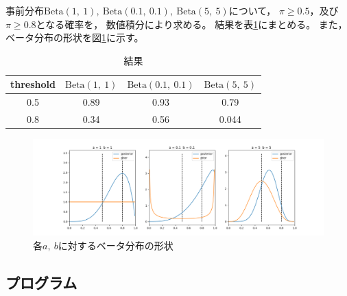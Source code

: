 \documentclass[dvipdfmx, fleqn]{jsarticle}
\begin{document}
事前分布\(\mathrm{Beta}(1,\ 1),\ \mathrm{Beta}(0.1,\ 0.1),\ \mathrm{Beta}(5,\ 5)\)について，
\(\pi \ge 0.5\)，及び\(\pi \ge 0.8\)となる確率を，
数値積分により求める。
結果を表\ref{tab:result}にまとめる。
また，ベータ分布の形状を図\ref{fig:beta_dists}に示す。


\begin{table}
    \centering
    \caption{結果}
    \begin{tabular}{cccc}
        threshold & \(\mathrm{Beta}(1,\ 1)\) & \(\mathrm{Beta}(0.1,\ 0.1)\) & \(\mathrm{Beta}(5,\ 5)\) \\ \hline
        0.5 & 0.89 & 0.93 & 0.79 \\
        0.8 & 0.34 & 0.56 & 0.044
    \end{tabular}
    \label{tab:result}
\end{table}


\begin{figure}[H]
    \centering
    \includegraphics[clip, width=15cm]{../figures/assignment1_result}
    \caption{各\(a,\ b\)に対するベータ分布の形状}
    \label{fig:beta_dists}
\end{figure}


\subsection*{プログラム}

\end{document}
